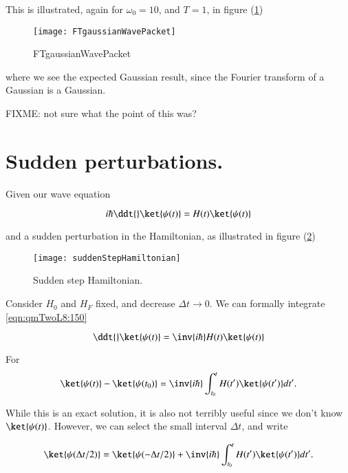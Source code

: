 This is illustrated, again for $\omega_0 = 10$, and $T=1$, in figure (\ref{fig:FTgaussianWavePacket})

\begin{figure}[htp]
\centering
\texttt{[image: FTgaussianWavePacket]}
\caption{FTgaussianWavePacket}\label{fig:FTgaussianWavePacket}
\end{figure}

where we see the expected Gaussian result, since the Fourier transform of a Gaussian is a Gaussian.

FIXME: not sure what the point of this was?

\section{Sudden perturbations.}

Given our wave equation

\begin{equation}\label{eqn:qmTwoL8:150}
i \hbar \ddt{} \ket{\psi(t)} = H(t) \ket{\psi(t)}
\end{equation}

and a sudden perturbation in the Hamiltonian, as illustrated in figure (\ref{fig:suddenStepHamiltonian})

\begin{figure}[htp]
\centering
\texttt{[image: suddenStepHamiltonian]}
\caption{Sudden step Hamiltonian.}\label{fig:suddenStepHamiltonian}
\end{figure}

Consider $H_0$ and $H_F$ fixed, and decrease $\Delta t \rightarrow 0$.  We can formally integrate \ref{eqn:qmTwoL8:150}

\begin{equation}\label{eqn:qmTwoL8:150b}
\ddt{} \ket{\psi(t)} = \inv{i \hbar} H(t) \ket{\psi(t)}
\end{equation}

For
\begin{equation}\label{eqn:qmTwoL8:150e}
\ket{\psi(t)} -\ket{\psi(t_0)}
 = \inv{i \hbar} \int_{t_0}^t H(t') \ket{\psi(t')} dt'.
\end{equation}

While this is an exact solution, it is also not terribly useful since we don't know $\ket{\psi(t)}$.  However, we can select the small interval $\Delta t$, and write

\begin{equation}\label{eqn:qmTwoL8:150c}
\ket{\psi(\Delta t/2)} =
\ket{\psi(-\Delta t/2)}
+ \inv{i \hbar} \int_{t_0}^t H(t') \ket{\psi(t')} dt'.
\end{equation}

